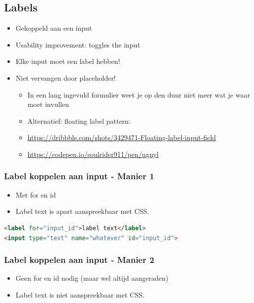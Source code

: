 \documentclass{article}
\begin{document}
\subsection{Labels}
\begin{itemize}
    \item Gekoppeld aan een input
    \item Usability improvement: toggles the input
    \item Elke input moet een label hebben!
    \item Niet vervangen door placeholder!
    \begin{itemize}
        \item In een lang ingevuld formulier weet je op den duur niet meer wat je waar moet invullen
        \item Alternatief: floating label pattern:
        \item \url{https://dribbble.com/shots/3429471-Floating-label-input-field}
        \item \url{https://codepen.io/soulrider911/pen/ugnyl}
    \end{itemize}
\end{itemize}

\subsubsection{Label koppelen aan input - Manier 1}

\begin{itemize}
    \item Met for en id
    \item Label text is apart aanspreekbaar met CSS.
\end{itemize}

\begin{lstlisting}[language=HTML]
<label for="input_id">label text</label>
<input type="text" name="whatever" id="input_id">
\end{lstlisting}



\subsubsection{Label koppelen aan input - Manier 2}
\begin{itemize}
    \item Geen for en id nodig (maar wel altijd aangeraden)
    \item Label text is niet aanspreekbaar met CSS.
\end{itemize}
\end{document}
